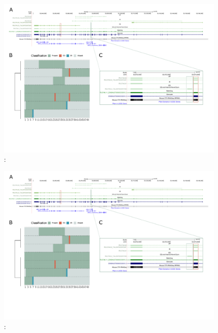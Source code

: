 \begin{landscape}
	\begin{figure}[htp]
		\begin{center}
			\includegraphics[page=12,trim={0 1cm 0 0},scale = 0.85]{Figures/TargetGenes_Annotation_Landscape.pdf}
		\end{center}
		\captionsetup{width=0.95\textwidth}
		\caption[RNA-Seq defined transcriptome]%
		{\textbf{}: }   
		\label{fig:trem2}
	\end{figure}
\end{landscape}

\begin{landscape}
	\begin{figure}[htp]
		\begin{center}
			\includegraphics[page=13,trim={0 1cm 0 0},scale = 0.85]{Figures/TargetGenes_Annotation_Landscape.pdf}
		\end{center}
		\captionsetup{width=0.95\textwidth}
		\caption[RNA-Seq defined transcriptome]%
		{\textbf{}: }   
		\label{fig:trem2_orf}
	\end{figure}
\end{landscape}

